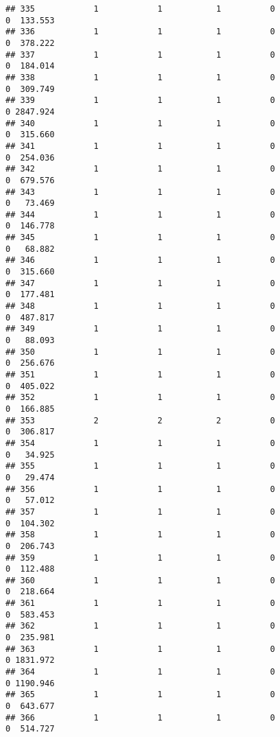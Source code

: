 \documentclass[
]{article}
\begin{document}
\begin{verbatim}
## 335            1            1           1          0                0  133.553
## 336            1            1           1          0                0  378.222
## 337            1            1           1          0                0  184.014
## 338            1            1           1          0                0  309.749
## 339            1            1           1          0                0 2847.924
## 340            1            1           1          0                0  315.660
## 341            1            1           1          0                0  254.036
## 342            1            1           1          0                0  679.576
## 343            1            1           1          0                0   73.469
## 344            1            1           1          0                0  146.778
## 345            1            1           1          0                0   68.882
## 346            1            1           1          0                0  315.660
## 347            1            1           1          0                0  177.481
## 348            1            1           1          0                0  487.817
## 349            1            1           1          0                0   88.093
## 350            1            1           1          0                0  256.676
## 351            1            1           1          0                0  405.022
## 352            1            1           1          0                0  166.885
## 353            2            2           2          0                0  306.817
## 354            1            1           1          0                0   34.925
## 355            1            1           1          0                0   29.474
## 356            1            1           1          0                0   57.012
## 357            1            1           1          0                0  104.302
## 358            1            1           1          0                0  206.743
## 359            1            1           1          0                0  112.488
## 360            1            1           1          0                0  218.664
## 361            1            1           1          0                0  583.453
## 362            1            1           1          0                0  235.981
## 363            1            1           1          0                0 1831.972
## 364            1            1           1          0                0 1190.946
## 365            1            1           1          0                0  643.677
## 366            1            1           1          0                0  514.727

\end{verbatim}
\end{document}
